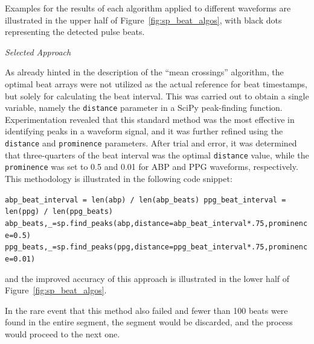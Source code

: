 Examples for the results of each algorithm applied to different waveforms are illustrated in the upper half of Figure~\ref{fig:sp_beat_algos}, with black dots representing the detected pulse beats.

\vspace{0.1cm}
\textit{Selected Approach}
\vspace{0.1cm}

As already hinted in the description of the \enquote{mean crossings} algorithm, the optimal beat arrays were not utilized as the actual reference for beat timestamps, but solely for calculating the beat interval.
This was carried out to obtain a single variable, namely the \texttt{distance} parameter in a SciPy peak-finding function.
Experimentation revealed that this standard method was the most effective in identifying peaks in a waveform signal, and it was further refined using the \texttt{distance} and \texttt{prominence} parameters.
After trial and error, it was determined that three-quarters of the beat interval was the optimal \texttt{distance} value, while the \texttt{prominence} was set to 0.5 and 0.01 for ABP and PPG waveforms, respectively.
This methodology is illustrated in the following code snippet:

\vspace{0.1cm}
{\centering \texttt{abp\_beat\_interval = len(abp) / len(abp\_beats) \newline
ppg\_beat\_interval = len(ppg) / len(ppg\_beats) \newline
abp\_beats,\_=sp.find\_peaks(abp,distance=abp\_beat\_interval*.75,prominence=0.5) \newline
ppg\_beats,\_=sp.find\_peaks(ppg,distance=ppg\_beat\_interval*.75,prominence=0.01) \newline}}

\vspace{-0.5cm}
and the improved accuracy of this approach is illustrated in the lower half of \\ Figure~\ref{fig:sp_beat_algos}.

In the rare event that this method also failed and fewer than 100 beats were found in the entire segment, the segment would be discarded, and the process would proceed to the next one.

